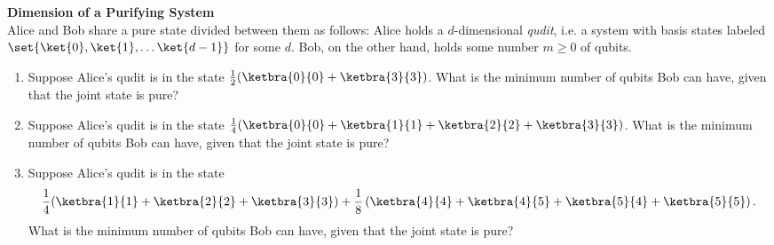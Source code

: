 \begin{exercises}
\item {\bf Dimension of a Purifying System}\\
%
Alice and Bob share a pure state divided between them as follows: Alice holds a $d$-dimensional \textit{qudit}, i.e. a system with basis states labeled $\set{\ket{0},\ket{1},\ldots \ket{d-1}}$ for some $d$. Bob, on the other hand, holds some number $m \geq 0$ of qubits.
\begin{enumerate}
\item Suppose Alice's qudit is in the state $\frac{1}{2}(\ketbra{0}{0}+\ketbra{3}{3})$. What is the minimum number of qubits Bob can have, given that the joint state is pure?
%
\item Suppose Alice's qudit is in the state $\frac{1}{4}(\ketbra{0}{0}+\ketbra{1}{1}+\ketbra{2}{2}+\ketbra{3}{3})$. What is the minimum number of qubits Bob can have, given that the joint state is pure?
%
\item Suppose Alice's qudit is in the state
\[
\frac{1}{4}(\ketbra{1}{1}+\ketbra{2}{2}+\ketbra{3}{3})+\frac{1}{8}\left(\ketbra{4}{4}+\ketbra{4}{5}+\ketbra{5}{4}+\ketbra{5}{5}\right).
\]
What is the minimum number of qubits Bob can have, given that the joint state is pure?
\end{enumerate}
%


\end{exercises}
